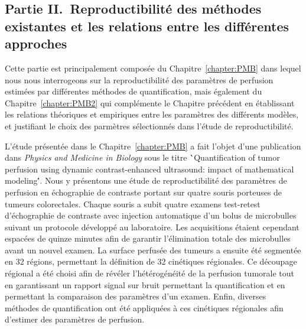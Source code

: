 \begin{otherlanguage}{francais}
\subsection*{Partie II.~Reproductibilit\'e des m\'ethodes existantes et les relations entre les diff\'erentes approches}
Cette partie est principalement compos\'ee du Chapitre~\ref{chapter:PMB} dans lequel nous nous interrogeons sur la reproductibilit\'e des param\`etres de perfusion estim\'ees par diff\'erentes m\'ethodes de quantification, mais \'egalement du Chapitre~\ref{chapter:PMB2} qui compl\'emente le Chapitre pr\'ec\'edent en \'etablissant les relations th\'eoriques et empiriques entre les param\`etres des diff\'erents mod\`eles, et justifiant le choix des parm\`etres s\'electionn\'es dans l'\'etude de reproductibilit\'e.

L'\'etude pr\'esent\'ee dans le Chapitre~\ref{chapter:PMB} a fait l'objet d'une publication dans {\em Physics and Medicine in Biology} sous le titre \``Quantification of tumor perfusion using dynamic contrast-enhanced ultrasound: impact of mathematical modeling\''.
Nous y pr\'esentons une \'etude de reproductibilit\'e des param\`etres de perfusion en \'echographie de contraste portant sur quatre souris porteuses de tumeurs colorectales.
Chaque souris a subit quatre examens test-retest d'\'echographie de contraste avec injection automatique d'un bolus de microbulles suivant un protocole d\'evelopp\'e au laboratoire.
Les acquisitions \'etaient cependant espac\'ees de quinze minutes afin de garantir l'\'elimination totale des microbulles avant un nouvel examen.
La surface perfus\'ee des tumeurs a ensuite \'et\'e segment\'ee en 32 r\'egions, permettant la d\'efinition de 32 cin\'etiques r\'egionales.
Ce d\'ecoupage r\'egional a \'et\'e choisi afin de r\'ev\'eler l'h\'et\'erog\'en\'eit\'e de la perfusion tumorale tout en garantissant un rapport signal sur bruit permettant la quantification et en permettant la comparaison des param\`etres d'un examen.
Enfin, diverses m\'ethodes de quantification ont \'et\'e appliqu\'ees \`a ces cin\'etiques r\'egionales afin d'estimer des param\`etres de perfusion.


\end{otherlanguage}
